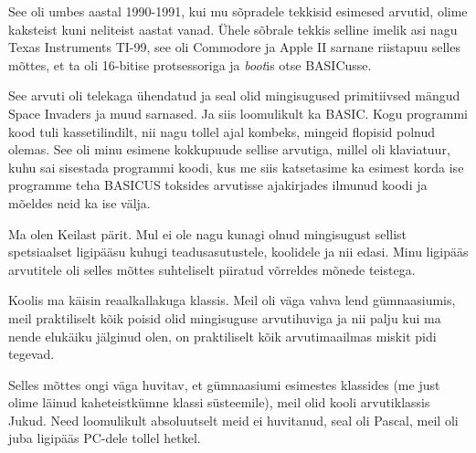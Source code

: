 See oli umbes aastal 1990-1991, kui mu sõpradele tekkisid esimesed arvutid, 
olime kaksteist kuni neliteist aastat vanad. Ühele sõbrale tekkis selline 
imelik asi nagu Texas Instruments TI-99, see oli Commodore ja Apple 
II sarnane riistapuu selles mõttes, et ta oli 16-bitise protsessoriga ja 
\emph{boot}is otse BASICusse. 

See arvuti oli telekaga ühendatud ja seal olid mingisugused primitiivsed mängud 
Space Invaders ja muud sarnased. Ja siis 
loomulikult ka BASIC. Kogu programmi kood tuli kassetilindilt, nii nagu tollel 
ajal kombeks, mingeid flopisid polnud olemas. See oli minu esimene kokkupuude 
sellise arvutiga, millel oli klaviatuur, kuhu sai sisestada programmi koodi, 
kus me siis katsetasime ka esimest korda ise programme teha BASICUS toksides 
arvutisse ajakirjades ilmunud koodi ja mõeldes neid ka ise välja. 


Ma olen Keilast pärit. Mul ei ole nagu kunagi olnud mingisugust 
sellist spetsiaalset ligipääsu kuhugi  teadusasutustele, koolidele ja nii 
edasi. Minu ligipääs arvutitele oli selles mõttes suhteliselt  piiratud 
võrreldes mõnede teistega.


Koolis ma käisin reaalkallakuga klassis. Meil oli väga vahva lend 
gümnaasiumis, meil praktiliselt kõik poisid olid 
mingisuguse arvutihuviga ja nii palju kui ma nende elukäiku jälginud olen, on 
praktiliselt kõik  arvutimaailmas miskit pidi tegevad.


Selles mõttes ongi väga huvitav, et gümnaasiumi esimestes klassides (me just 
olime läinud kaheteistkümne klassi süsteemile), meil olid kooli arvutiklassis  
Jukud. Need loomulikult absoluutselt meid ei huvitanud, 
seal oli Pascal, meil oli juba ligipääs PC-dele tollel 
hetkel. 


